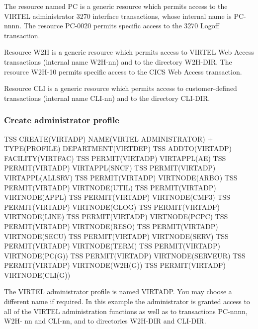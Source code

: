\documentclass[letterpaper,10pt,english]{sphinxmanual}
\begin{document}
The resource named PC is a generic resource which permits access to the VIRTEL administrator 3270 interface transactions, whose internal name is PC-nnnn. The resource PC-0020 permits specific access to the 3270 Logoff transaction.

Resource W2H is a generic resource which permits access to VIRTEL Web Access transactions (internal name W2H-nn) and to the directory W2H-DIR. The resource W2H-10 permits specific access to the CICS Web Access transaction.

Resource CLI is a generic resource which permits access to customer-defined transactions (internal name CLI-nn) and to the directory CLI-DIR.


\subsubsection{Create administrator profile}
\label{\detokenize{Installation_Guide:create-administrator-profile}}
\begin{sphinxVerbatim}[commandchars=\\\{\}]
TSS CREATE(VIRTADP) NAME(\PYGZsq{}VIRTEL ADMINISTRATOR\PYGZsq{}) +
        TYPE(PROFILE) DEPARTMENT(VIRTDEP)
TSS ADDTO(VIRTADP) FACILITY(VIRTFAC)
TSS PERMIT(VIRTADP) VIRTAPPL(AE)
TSS PERMIT(VIRTADP) VIRTAPPL(SNCF)
TSS PERMIT(VIRTADP) VIRTAPPL(\PYGZdl{}\PYGZdl{}ALLSRV)
TSS PERMIT(VIRTADP) VIRTNODE(\PYGZdl{}\PYGZdl{}ARBO\PYGZdl{}\PYGZdl{})
TSS PERMIT(VIRTADP) VIRTNODE(\PYGZdl{}\PYGZdl{}UTIL\PYGZdl{}\PYGZdl{})
TSS PERMIT(VIRTADP) VIRTNODE(\PYGZdl{}\PYGZdl{}APPL\PYGZdl{}\PYGZdl{})
TSS PERMIT(VIRTADP) VIRTNODE(\PYGZdl{}\PYGZdl{}CMP3\PYGZdl{}\PYGZdl{})
TSS PERMIT(VIRTADP) VIRTNODE(\PYGZdl{}\PYGZdl{}GLOG\PYGZdl{}\PYGZdl{})
TSS PERMIT(VIRTADP) VIRTNODE(\PYGZdl{}\PYGZdl{}LINE\PYGZdl{}\PYGZdl{})
TSS PERMIT(VIRTADP) VIRTNODE(\PYGZdl{}\PYGZdl{}PCPC\PYGZdl{}\PYGZdl{})
TSS PERMIT(VIRTADP) VIRTNODE(\PYGZdl{}\PYGZdl{}RESO\PYGZdl{}\PYGZdl{})
TSS PERMIT(VIRTADP) VIRTNODE(\PYGZdl{}\PYGZdl{}SECU\PYGZdl{}\PYGZdl{})
TSS PERMIT(VIRTADP) VIRTNODE(\PYGZdl{}\PYGZdl{}SERV\PYGZdl{}\PYGZdl{})
TSS PERMIT(VIRTADP) VIRTNODE(\PYGZdl{}\PYGZdl{}TERM\PYGZdl{}\PYGZdl{})
TSS PERMIT(VIRTADP) VIRTNODE(PC(G))
TSS PERMIT(VIRTADP) VIRTNODE(SERVEUR)
TSS PERMIT(VIRTADP) VIRTNODE(W2H(G))
TSS PERMIT(VIRTADP) VIRTNODE(CLI(G))
\end{sphinxVerbatim}


The VIRTEL administrator profile is named VIRTADP. You may choose a different name if required. In this example the administrator is granted access to all of the VIRTEL administration functions as well as to transactions PC-nnnn, W2H- nn and CLI-nn, and to directories W2H-DIR and CLI-DIR.
\end{document}
